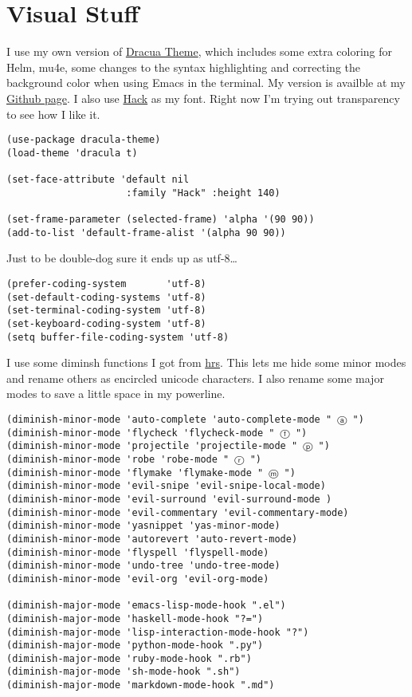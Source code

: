 \documentclass{article}
\begin{document}
\section{Visual Stuff}
\label{sec-6}

I use my own version of \href{https://github.com/dracula/dracula-theme}{Dracua Theme}, which includes some extra coloring for Helm, mu4e, some changes to the syntax highlighting and correcting the background color when using Emacs in the terminal. My version is availble at my \href{https://github.com/apierz}{Github page}. I also use \href{http://sourcefoundry.org/hack/}{Hack} as my font. Right now I'm trying out transparency to see how I like it.

\begin{verbatim}
(use-package dracula-theme)
(load-theme 'dracula t)

(set-face-attribute 'default nil
                     :family "Hack" :height 140)

(set-frame-parameter (selected-frame) 'alpha '(90 90))
(add-to-list 'default-frame-alist '(alpha 90 90))
\end{verbatim}

Just to be double-dog sure it ends up as utf-8\ldots{}

\begin{verbatim}
(prefer-coding-system       'utf-8)
(set-default-coding-systems 'utf-8)
(set-terminal-coding-system 'utf-8)
(set-keyboard-coding-system 'utf-8)
(setq buffer-file-coding-system 'utf-8)
\end{verbatim}

I use some diminsh functions I got from \href{https://github.com/hrs}{hrs}. This lets me hide some minor modes and rename others as encircled unicode characters. I also rename some major modes to save a little space in my powerline.

\begin{verbatim}
(diminish-minor-mode 'auto-complete 'auto-complete-mode " ⓐ ")
(diminish-minor-mode 'flycheck 'flycheck-mode " ⓕ ")
(diminish-minor-mode 'projectile 'projectile-mode " ⓟ ")
(diminish-minor-mode 'robe 'robe-mode " ⓡ ")
(diminish-minor-mode 'flymake 'flymake-mode " ⓜ ")
(diminish-minor-mode 'evil-snipe 'evil-snipe-local-mode)
(diminish-minor-mode 'evil-surround 'evil-surround-mode )
(diminish-minor-mode 'evil-commentary 'evil-commentary-mode)
(diminish-minor-mode 'yasnippet 'yas-minor-mode)
(diminish-minor-mode 'autorevert 'auto-revert-mode)
(diminish-minor-mode 'flyspell 'flyspell-mode)
(diminish-minor-mode 'undo-tree 'undo-tree-mode)
(diminish-minor-mode 'evil-org 'evil-org-mode)

(diminish-major-mode 'emacs-lisp-mode-hook ".el")
(diminish-major-mode 'haskell-mode-hook "?=")
(diminish-major-mode 'lisp-interaction-mode-hook "?")
(diminish-major-mode 'python-mode-hook ".py")
(diminish-major-mode 'ruby-mode-hook ".rb")
(diminish-major-mode 'sh-mode-hook ".sh")
(diminish-major-mode 'markdown-mode-hook ".md")
\end{verbatim}
\end{document}
